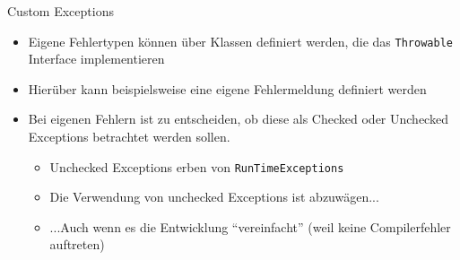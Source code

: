 \begin{frame}{Custom Exceptions}{}
    \begin{itemize}
        \item Eigene Fehlertypen können über Klassen definiert werden, die das \texttt{Throwable} Interface implementieren
        \item Hierüber kann beispielsweise eine eigene Fehlermeldung definiert werden
        \item Bei eigenen Fehlern ist zu entscheiden, ob diese als Checked oder Unchecked Exceptions betrachtet werden sollen.
        \begin{itemize}
            \item Unchecked Exceptions erben von \texttt{RunTimeExceptions}
            \item Die Verwendung von unchecked Exceptions ist abzuwägen...
            \item ...Auch wenn es die Entwicklung "`vereinfacht"' (weil keine Compilerfehler auftreten)
        \end{itemize}
    \end{itemize}
\end{frame}